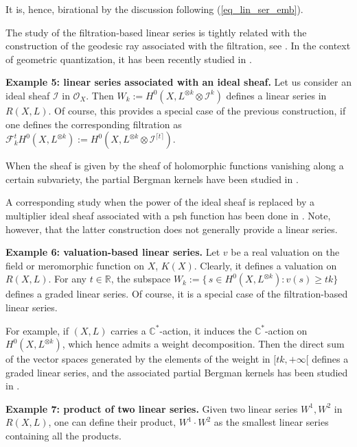 \documentclass[12pt]{article}
\numberwithin{equation}{section}
\theoremstyle{theorem}
\theoremstyle{definition}
\theoremstyle{remark}
\newcommand{\comp}{\mathbb{C}}
\newcommand{\real}{\mathbb{R}}
\begin{document}
	It is, hence, birational by the discussion following (\ref{eq_lin_ser_emb}).
	\par 
	The study of the filtration-based linear series is tightly related with the construction of the geodesic ray associated with the filtration, see \cite{PhongSturmTestGeodK, RossNystAnalTConf, HisamSpecMeas}. 
	In the context of geometric quantization, it has been recently studied in \cite{FinNarSim, FinSubmToepl, FinGQBig}.
	\par 
	\textbf{Example 5: linear series associated with an ideal sheaf.}
	Let us consider an ideal sheaf $\mathcal{I}$ in $\mathscr{O}_X$.
	Then $W_k := H^0(X, L^{\otimes k} \otimes \mathcal{I}^k)$ defines a linear series in $R(X, L)$.
	Of course, this provides a special case of the previous construction, if one defines the corresponding filtration as $\mathcal{F}^t_k H^0(X, L^{\otimes k}) := H^0(X, L^{\otimes k} \otimes \mathcal{I}^{\lceil t \rceil})$.
	\par 
	When the sheaf is given by the sheaf of holomorphic functions vanishing along a certain subvariety, the partial Bergman kernels have been studied in \cite{BermanEnvProj, ComMar, RossSingPartDens}.
	\par 
	A corresponding study when the power of the ideal sheaf is replaced by a multiplier ideal sheaf associated with a psh function has been done in \cite{DarvXiaVolumes}.
	Note, however, that the latter construction does not generally provide a linear series.
	\par 
	\textbf{Example 6: valuation-based linear series.}
	Let $v$ be a real valuation on the field or meromorphic function on $X$, $K(X)$.
	Clearly, it defines a valuation on $R(X, L)$.
	For any $t \in \real$, the subspace $W_k := \{\, s \in H^0(X, L^{\otimes k}) : v(s) \geq tk \}$ defines a graded linear series.
	Of course, it is a special case of the filtration-based linear series.
	\par
	For example, if $(X, L)$ carries a $\comp^*$-action, it induces the $\comp^*$-action on $H^0(X, L^{\otimes k})$, which hence admits a weight decomposition. 
	Then the direct sum of the vector spaces generated by the elements of the weight in $[tk, +\infty[$ defines a graded linear series, and the associated partial Bergman kernels has been studied in \cite{IoosPartial}.
	\par 
	\textbf{Example 7: product of two linear series.}
	Given two linear series $W^1, W^2$ in $R(X, L)$, one can define their product, $W^1 \cdot W^2$ as the smallest linear series containing all the products. 
\end{document}
